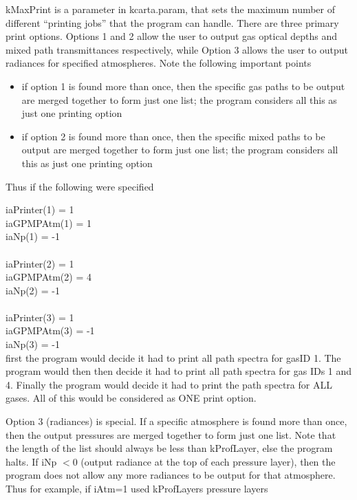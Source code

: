 \documentclass[12pt]{article}
\newcommand{\ttab}{\indent\indent}
\begin{document}
{{{kMaxPrint is a parameter in {\sf kcarta.param}, that sets the
maximum number of different ``printing jobs'' that the program can
handle.  There are three primary print options.  Options 1 and 2
allow the user to output gas optical depths and mixed path
transmittances respectively, while Option 3 allows the user to
output radiances for specified atmospheres.  Note the following
important points

\begin{itemize}
\item if option 1 is found more than once, then the specific gas
  paths to be output are merged together to form just one list; the
  program considers all this as just one printing option

\item if option 2 is found more than once, then the specific mixed
  paths to be output are merged together to form just one list; the
  program considers all this as just one printing option
\end{itemize}

\noindent
Thus if the following were specified

\medskip
\ttab iaPrinter(1) = 1\\
\ttab  iaGPMPAtm(1) = 1\\
\ttab  iaNp(1) = -1\\
\ttab \\
\ttab iaPrinter(2) = 1\\
\ttab  iaGPMPAtm(2) = 4\\
\ttab  iaNp(2) = -1\\
\ttab \\
\ttab iaPrinter(3) = 1\\
\ttab  iaGPMPAtm(3) = -1\\
\ttab  iaNp(3) = -1\\

\medskip\noindent
first the program would decide it had to print all path spectra for
gasID 1.  The program would then then decide it had to print all
path spectra for gas IDs 1 and 4.  Finally the program would decide
it had to print the path spectra for ALL gases.  All of this would
be considered as ONE print option.

Option 3 (radiances) is special.  If a specific atmosphere is found
more than once, then the output pressures are merged together to
form just one list.  Note that the length of the list should always
be less than kProfLayer, else the program halts.  If
iNp $< 0$ (output radiance at the top of each pressure layer), then
the program does not allow any more radiances to be output for that
atmosphere.  Thus for example, if iAtm=1 used kProfLayers pressure layers

}}}
\end{document}
